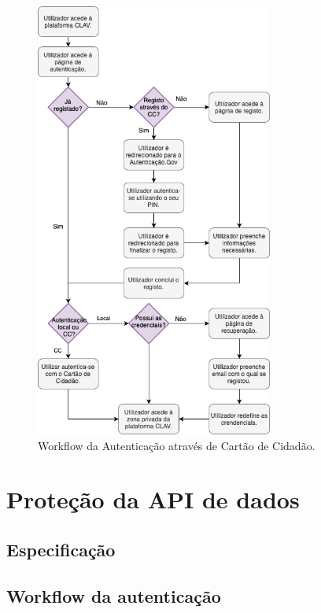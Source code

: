 \begin{figure}[h!]
    \centering
    \includegraphics[width=0.695\textwidth]{img/diagramas/authCC/AuthCC.png}
    \caption{Workflow da Autenticação através de Cartão de Cidadão.}
    \label{fig:flow_authCC}
\end{figure}

\cleardoublepage
\section{Proteção da API de dados}

\subsection{Especificação}


\subsection{Workflow da autenticação}